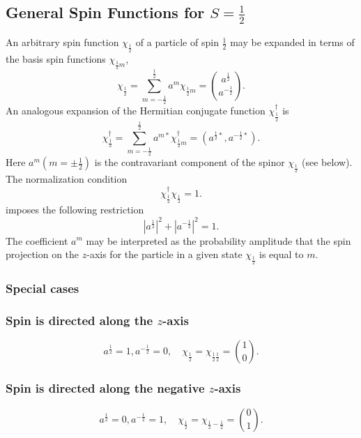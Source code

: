 \subsection{General Spin Functions for $S=\frac{1}{2}$}\label{sec:6.2.6}
An arbitrary spin function $\chi_{\frac{1}{2}}$ of a particle of spin $\frac{1}{2}$ may be expanded in terms of the basis spin functions $\chi_{\frac{1}{2} m}$,
\begin{equation}
\chi_{\frac{1}{2}}=\sum_{m=-\frac{1}{2}}^{\frac{1}{2}} a^{m} \chi_{\frac{1}{2} m}=\binom{a^{\frac{1}{2}}}{a^{-\frac{1}{2}}} . \label{eq:6:2:32}
\end{equation}
An analogous expansion of the Hermitian conjugate function $\chi_{\frac{1}{2}}^{\dagger}$ is
\begin{equation}
\chi_{\frac{1}{2}}^{\dagger}=\sum_{m=-\frac{1}{2}}^{\frac{1}{2}} a^{m *} \chi_{\frac{1}{2} m}^{\dagger}=\left(a^{\frac{1}{2} *}, a^{-\frac{1}{2} *}\right) . \label{eq:6:2:33}
\end{equation}
Here $a^{m}\left(m= \pm \frac{1}{2}\right)$ is the contravariant component of the spinor $\chi_{\frac{1}{2}}$ (see below). The normalization condition
\begin{equation}
\chi_{\frac{1}{2}}^{\dagger} \chi_{\frac{1}{2}}=1 . \label{eq:6:2:34}
\end{equation}
imposes the following restriction
\[
\left|a^{\frac{1}{2}}\right|^{2}+\left|a^{-\frac{1}{2}}\right|^{2}=1 .
\]
The coefficient $a^{m}$ may be interpreted as the probability amplitude that the spin projection on the $z$-axis for the particle in a given state $\chi_{\frac{1}{2}}$ is equal to $m$.

\subsubsection{Special cases}
\subsubsection{Spin is directed along the $z$-axis}
\begin{equation}
a^{\frac{1}{2}}=1, a^{-\frac{1}{2}}=0, \quad \chi_{\frac{1}{2}}=\chi_{\frac{1}{2} \frac{1}{2}}=\binom{1}{0} . \label{eq:6:2:35}
\end{equation}
\subsubsection{Spin is directed along the negative $z$-axis}
\begin{equation}
a^{\frac{1}{2}}=0, a^{-\frac{1}{2}}=1, \quad \chi_{\frac{1}{2}}=\chi_{\frac{1}{2}-\frac{1}{2}}=\binom{0}{1} . \label{eq:6:2:36}
\end{equation}
